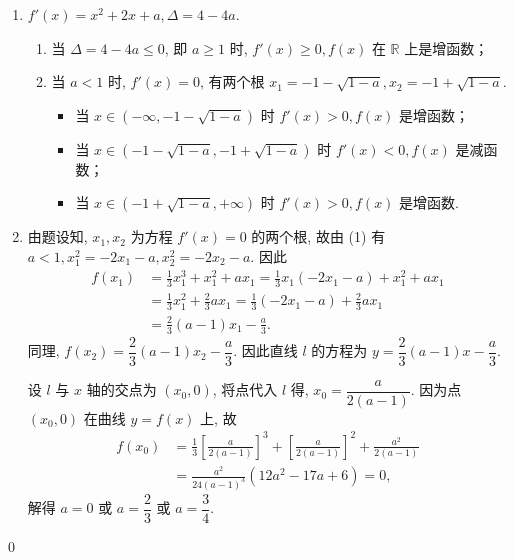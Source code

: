\begin{jie}
    \begin{enumerate}
        \item $f'(x) = x^2 + 2x + a, \Delta = 4 - 4a$.
        \begin{enumerate}
            \item 当 $\Delta = 4 - 4a \leq 0$, 即 $a \geq 1$ 时, $f'(x) \geq 0, f(x)$ 在 $\mathbb{R}$ 上是增函数；
            \item 当 $a < 1$ 时, $f'(x) = 0$, 有两个根 $x_1 = -1 - \sqrt{1-a}, x_2 = -1 + \sqrt{1-a}$. 
            \begin{itemize}
                \item 当 $x \in (-\infty, -1 - \sqrt{1-a})$ 时 $f'(x) > 0, f(x)$ 是增函数；
                \item 当 $x \in (-1 - \sqrt{1-a}, -1 + \sqrt{1-a})$ 时 $f'(x) < 0, f(x)$ 是减函数；
                \item 当 $x \in (-1 + \sqrt{1-a}, +\infty)$ 时 $f'(x) > 0, f(x)$ 是增函数. 
            \end{itemize}
        \end{enumerate}
        \item 由题设知, $x_1, x_2$ 为方程 $f'(x) = 0$ 的两个根, 故由 (1) 有 $a < 1, x_1^2 = -2x_1 - a, x_2^2 = -2x_2 - a$. 
        因此
        \begin{align*}
     f(x_1) &= \frac{1}{3}x_1^3 + x_1^2 + ax_1 = \frac{1}{3}x_1(-2x_1 - a) + x_1^2 + ax_1 \\
            &= \frac{1}{3}x_1^2 + \frac{2}{3}ax_1 = \frac{1}{3}(-2x_1 - a) + \frac{2}{3}ax_1 \\
            &= \frac{2}{3}(a-1)x_1 - \frac{a}{3}.
        \end{align*}
        同理, $f(x_2) = \dfrac{2}{3}(a-1)x_2 - \dfrac{a}{3}$. 因此直线 $l$ 的方程为 $y = \dfrac{2}{3}(a-1)x - \dfrac{a}{3}$. 
    
        设 $l$ 与 $x$ 轴的交点为 $(x_0, 0)$, 将点代入 $l$ 得, $x_0 = \dfrac{a}{2(a-1)}$. 因为点 $(x_0, 0)$ 在曲线 $y = f(x)$ 上, 故
        \begin{align*}
          f(x_0) &= \frac{1}{3}\left[\frac{a}{2(a-1)}\right]^3 + \left[\frac{a}{2(a-1)}\right]^2 + \frac{a^2}{2(a-1)} \\
            &= \frac{a^2}{24(a-1)^3}(12a^2 - 17a + 6) = 0,
        \end{align*}
        解得 $a = 0$ 或 $a = \dfrac{2}{3}$ 或 $a = \dfrac{3}{4}$. 
    \end{enumerate}
\qed
\end{jie}

